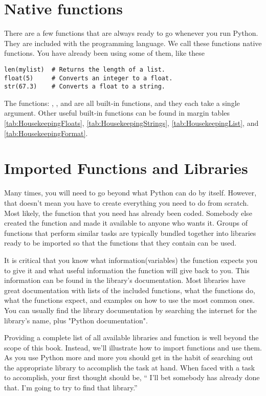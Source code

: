 \section{Native functions}
There are a few functions that are always ready to go whenever you run Python. They are included with the
programming language.  We call these functions native
functions.  You have already been using some
of them, like these
\begin{Verbatim}
len(mylist)  # Returns the length of a list.
float(5)     # Converts an integer to a float.
str(67.3)    # Converts a float to a string.
\end{Verbatim}
The functions: , , and  are all
built-in functions, and they each take a single argument.  Other
useful built-in functions can be found in margin tables
\ref{tab:HousekeepingFloats}, \ref{tab:HousekeepingStrings}, \ref{tab:HousekeepingList}, and \ref{tab:HousekeepingFormat}.





\section{Imported Functions and Libraries}
Many times, you will need to go beyond what Python can do by itself. However, that doesn't mean you have to create everything you need to do from scratch.  Most likely, the function that you need has already been coded. Somebody
else created the function and made it available to anyone
who wants it.  Groups of functions that perform similar tasks are
typically bundled together into libraries ready to be imported so that the functions that they contain can be used.

It is critical that you know what information(variables) the function expects you to give it and what
useful information the function will give back to you.  This
information can be found in the library's documentation. Most libraries have great documentation with lists of the included functions, what the functions do, what the functions expect, and examples on how to use the most common ones.  You can usually find the library documentation by searching the internet for the library's name, plus "Python documentation".

Providing a complete list of all available libraries and function is well beyond
the scope of this book. Instead, we'll illustrate how to import
functions and use them.  As you use Python more and more you
should get in the habit of searching out the appropriate library to
accomplish the task at hand. When faced with a task to accomplish,
your first thought should be, `` I'll bet somebody has already done that.
I'm going to try to find that library.''



